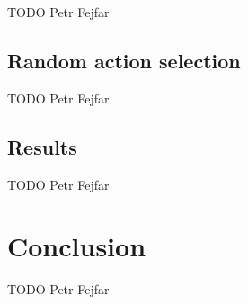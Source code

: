 \documentclass[12pt,a4paper]{article}
\begin{document}
TODO Petr Fejfar

\subsection{Random action selection}

TODO Petr Fejfar


\subsection{Results}

TODO Petr Fejfar


\section{Conclusion}

TODO Petr Fejfar



\end{document}
